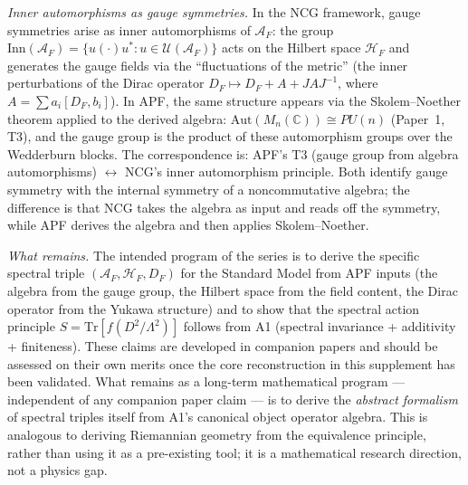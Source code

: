\documentclass[11pt,a4paper]{article}
\theoremstyle{definition}
\begin{document}
\smallskip\noindent\textit{Inner automorphisms as gauge symmetries.}  In the NCG framework, gauge symmetries arise as inner automorphisms of $\mathcal{A}_F$: the group $\mathrm{Inn}(\mathcal{A}_F) = \{u(\cdot)u^* : u \in \mathcal{U}(\mathcal{A}_F)\}$ acts on the Hilbert space $\mathcal{H}_F$ and generates the gauge fields via the ``fluctuations of the metric'' (the inner perturbations of the Dirac operator $D_F \mapsto D_F + A + JAJ^{-1}$, where $A = \sum a_i[D_F, b_i]$).  In APF, the same structure appears via the Skolem--Noether theorem applied to the derived algebra: $\mathrm{Aut}(M_n(\mathbb{C})) \cong PU(n)$ (Paper~1, T3), and the gauge group is the product of these automorphism groups over the Wedderburn blocks.  The correspondence is: APF's T3 (gauge group from algebra automorphisms) $\leftrightarrow$ NCG's inner automorphism principle.  Both identify gauge symmetry with the internal symmetry of a noncommutative algebra; the difference is that NCG takes the algebra as input and reads off the symmetry, while APF derives the algebra and then applies Skolem--Noether.

\smallskip\noindent\textit{What remains.}  The intended program of the series is to derive the specific spectral triple $(\mathcal{A}_F, \mathcal{H}_F, D_F)$ for the Standard Model from APF inputs (the algebra from the gauge group, the Hilbert space from the field content, the Dirac operator from the Yukawa structure) and to show that the spectral action principle $S = \mathrm{Tr}[f(D^2/\Lambda^2)]$ follows from A1 (spectral invariance + additivity + finiteness).  These claims are developed in companion papers and should be assessed on their own merits once the core reconstruction in this supplement has been validated.  What remains as a long-term mathematical program --- independent of any companion paper claim --- is to derive the \emph{abstract formalism} of spectral triples itself from A1's canonical object operator algebra.  This is analogous to deriving Riemannian geometry from the equivalence principle, rather than using it as a pre-existing tool; it is a mathematical research direction, not a physics gap.
\end{document}
